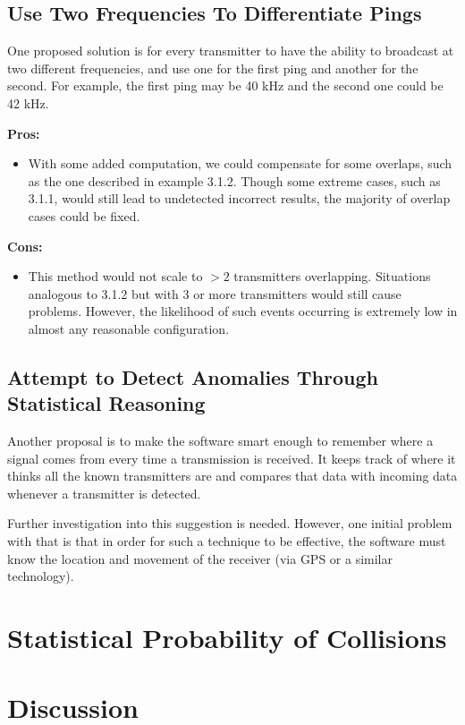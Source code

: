 \documentclass[12pt]{article}
\begin{document}
\subsection{Use Two Frequencies To Differentiate Pings}

One proposed solution is for every transmitter to have the ability to broadcast
at two different frequencies, and use one for the first ping and another for
the second. For example, the first ping may be 40 kHz and the second one could
be 42 kHz.

{\bf Pros:}
\begin{itemize}
	\item With some added computation, we could compensate for some overlaps,
	such as the one described in example 3.1.2.
	Though some extreme cases, such as 3.1.1, would still lead to undetected
	incorrect results, the majority of overlap cases could be fixed.
\end{itemize}

{\bf Cons:}
\begin{itemize}
	\item This method would not scale to $>2$ transmitters overlapping. 
		Situations analogous to 3.1.2 but with 3 or more transmitters would
		still cause problems.
		However, the likelihood of such events occurring is extremely low in
		almost any reasonable configuration.
\end{itemize}

\subsection{Attempt to Detect Anomalies Through Statistical Reasoning}

Another proposal is to make the software smart enough to remember where a
signal comes from every time a transmission is received. It keeps track of
where it thinks all the known transmitters are and compares that data with
incoming data whenever a transmitter is detected.

Further investigation into this suggestion is needed.
However, one initial problem with that is that in order for such a technique
to be effective, the software must know the location and movement of the
receiver (via GPS or a similar technology).

\section{Statistical Probability of Collisions}

\section{Discussion}
\end{document}

